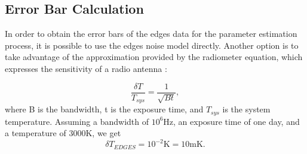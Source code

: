 \documentclass[12pt, TexShade, letterpaper]{report}
\begin{document}
\subsection{Error Bar Calculation}
\label{chap:results,sub:edges,subsub:error}
In order to obtain the error bars of the \gls{edges} data for the parameter estimation process, it is possible to use the \gls{edges} noise model directly. Another option is to take advantage of the approximation provided by the radiometer equation, which expresses the sensitivity of a radio antenna \cite{sensitivity_1, sensitivity_2}:\par
\begin{equation}
    \frac{\delta T}{T_{sys}} = \frac{1}{\sqrt{Bt}},
\end{equation}
where B is the bandwidth, t is the exposure time, and $T_{sys}$ is the system temperature. Assuming a bandwidth of $10^6\mathrm{Hz}$, an exposure time of one day, and a temperature of $\mathrm{3000K}$, we get
\begin{equation}
   \delta T_{EDGES} = \mathrm{10 ^{-2}K} = \mathrm{10mK}. 
\end{equation}
\end{document}
